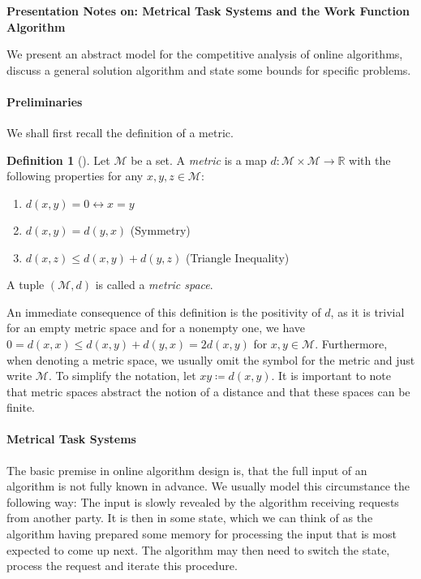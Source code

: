 \documentclass[10pt]{amsart}
\theoremstyle{definition}
\newtheorem{definition}{Definition}
\theoremstyle{remark}
\begin{document}
    \phantom{}

    \textbf{Presentation Notes on: Metrical Task Systems and the Work Function Algorithm}

    We present an abstract model for the competitive analysis of online algorithms, discuss a general solution algorithm and state some bounds for specific problems.

    \phantom{}

    \paragraph{\textbf{Preliminaries}} We shall first recall the definition of a metric.

    \begin{definition}[{\cite[pp. 3-4]{Forster2017}}]
        Let \(\mathcal{M}\) be a set. A \emph{metric} is a map \(d\colon \mathcal{M} \times \mathcal{M} \to \mathbb{R}\) with the following properties for any \(x, y, z \in \mathcal{M}\):
        \begin{enumerate}[label=(\roman*)]
            \item \(d(x, y) = 0 \leftrightarrow x = y\)
            \item \(d(x, y) = d(y, x)\) (Symmetry)
            \item \(d(x, z) \leq d(x, y) + d(y, z)\) (Triangle Inequality)
        \end{enumerate}
        A tuple \((\mathcal{M}, d)\) is called a \emph{metric space}.
    \end{definition}

    An immediate consequence of this definition is the positivity of \(d\), as it is trivial for an empty metric space and for a nonempty one, we have \(0 = d(x, x) \leq d(x, y) + d(y, x) = 2d(x, y)\) for \(x, y \in \mathcal{M}\). Furthermore, when denoting a metric space, we usually omit the symbol for the metric and just write \(\mathcal{M}\). To simplify the notation, let \(xy \coloneqq d(x, y)\). It is important to note that metric spaces abstract the notion of a distance and that these spaces can be finite.

    \phantom{}

    \paragraph{\textbf{Metrical Task Systems}} The basic premise in online algorithm design is, that the full input of an algorithm is not fully known in advance. We usually model this circumstance the following way: The input is slowly revealed by the algorithm receiving requests from another party. It is then in some state, which we can think of as the algorithm having prepared some memory for processing the input that is most expected to come up next. The algorithm may then need to switch the state, process the request and iterate this procedure.
\end{document}
